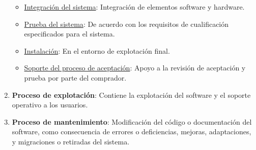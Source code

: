 \begin{enumerate}
\begin{itemize}
        \item \uline{Integración del sistema}: Integración de elementos software y hardware.
        \item \uline{Prueba del sistema}: De acuerdo con los requisitos de cualificación especificados para el sistema.
        \item \uline{Instalación}: En el entorno de explotación final.
        \item \uline{Soporte del proceso de aceptación}: Apoyo a la revisión de aceptación y prueba por parte del comprador.
    \end{itemize}
    \item \textbf{Proceso de explotación}: Contiene la explotación del software y el soporte operativo a los usuarios.
    \item \textbf{Proceso de mantenimiento}: Modificación del código o documentación del software, como consecuencia de errores o deficiencias, mejoras, adaptaciones, y migraciones o retiradas del sistema.
\end{enumerate}


